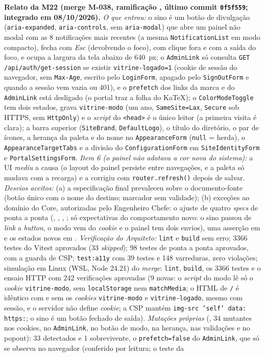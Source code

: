 \textbf{Relato da M22 (merge M-038, ramificação , último commit \texttt{0f5f559}; integrado em 08/10/2026).} \emph{O que entrou:} o sino é um botão de divulgação (\texttt{aria-expanded}, \texttt{aria-controls}, sem \texttt{aria-modal}) que abre um painel não modal com as 8 notificações mais recentes (a mesma \texttt{NotificationList} em modo compacto), fecha com \emph{Esc} (devolvendo o foco), com clique fora e com a saída do foco, e ocupa a largura da tela abaixo de 640~px; o \texttt{AdminLink} só consulta \texttt{GET /api/auth/get-session} se existir \texttt{vitrine-logado=1} (cookie de sessão do navegador, sem \texttt{Max-Age}, escrito pelo \texttt{LoginForm}, apagado pelo \texttt{SignOutForm} e quando a sessão vem vazia ou 401), e o \texttt{prefetch} dos links da marca e do \texttt{AdminLink} está desligado (o portal traz a folha do KaTeX); o \texttt{ColorModeToggle} tem dois estados, grava \texttt{vitrine-modo} (um ano, \texttt{SameSite=Lax}, \texttt{Secure} sob HTTPS, sem \texttt{HttpOnly}) e o \emph{script} do \texttt{<head>} é o único leitor (a primeira visita é clara); a barra superior (\texttt{SiteBrand}, \texttt{DefaultLogo}), o título do diretório, o par de ícones, a herança da paleta e do nome no \texttt{AppearanceForm} (\texttt{null} = herda), o \texttt{AppearanceTargetTabs} e a divisão do \texttt{ConfigurationForm} em \texttt{SiteIdentityForm} e \texttt{PortalSettingsForm}. \emph{Item 6 (o painel não adotava a cor nova do sistema):} a UI \emph{mediu} a causa (o layout do painel persiste entre navegações, e a paleta só mudava com a recarga) e a corrigiu com \texttt{router.refresh()} depois de salvar. \emph{Desvios aceitos:} (a) a especificação final prevaleceu sobre o documento-fonte (botão único com o nome do destino; marcador sem validade); (b) exceções ao domínio do Core, autorizadas pelo Engenheiro Chefe: o ajuste de quatro \emph{specs} de ponta a ponta (, , , ; só expectativas do comportamento novo: o sino passou de \emph{link} a \emph{button}, o modo vem do \emph{cookie} e o painel tem dois envios), uma asserção em  e os estados novos em . \emph{Verificação do Arquiteto:} \texttt{lint} e \texttt{build} sem erro; 3366 testes do Vitest aprovados (33 \emph{skipped}); 98 testes de ponta a ponta aprovados, com a guarda de CSP; \texttt{test:a11y} com 39 testes e 148 varreduras, zero violações; simulação em Linux (WSL, Node 24.21) do \emph{merge}: \texttt{lint}, \texttt{build}, os 3366 testes e o ensaio HTTP com 242 verificações aprovadas (9 novas: o \emph{script} do modo lê só o \emph{cookie} \texttt{vitrine-modo}, sem \texttt{localStorage} nem \texttt{matchMedia}; o HTML de \texttt{/} é idêntico com e sem os \emph{cookies} \texttt{vitrine-modo} e \texttt{vitrine-logado}, mesmo com sessão, e o servidor não define \emph{cookie}; a CSP mantém \texttt{img-src 'self' data: https:}; o sino é um botão fechado de saída). \emph{Mutações próprias} (, 34 mutantes nos cookies, no \texttt{AdminLink}, no botão de modo, na herança, nas validações e no popout): 33 detectados e 1 sobrevivente, o \texttt{prefetch={false}} do \texttt{AdminLink}, que só se observa no navegador (conferido por leitura; o teste da 